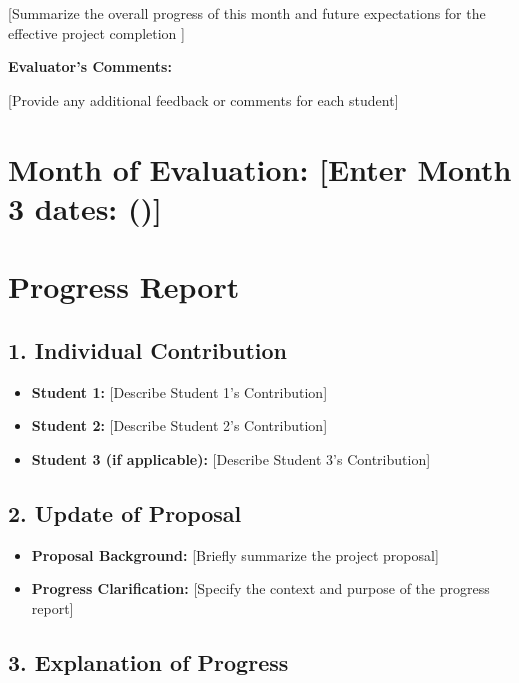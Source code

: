 [Summarize the overall progress of this month  and future expectations for the effective project completion ]

\vspace{1cm}

\textbf{Evaluator's Comments:}

[Provide any additional feedback or comments for each student]



\section*{Month of Evaluation: [Enter Month 3 dates: ()]}

\section*{Progress Report}

\subsection*{1. Individual Contribution}

\begin{itemize}
	\item \textbf{Student 1:} [Describe Student 1's Contribution]
	\item \textbf{Student 2:} [Describe Student 2's Contribution]
	\item \textbf{Student 3 (if applicable):} [Describe Student 3's Contribution]
\end{itemize}

\subsection*{2. Update of Proposal}

\begin{itemize}
	\item \textbf{Proposal Background:} [Briefly summarize the project proposal]
	\item \textbf{Progress Clarification:} [Specify the context and purpose of the progress report]
\end{itemize}

\subsection*{3. Explanation of Progress}

